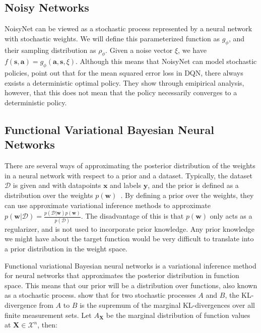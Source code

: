 \documentclass[]{uai2022} %
\newcommand{\D}{\mathcal{D}}
\newcommand{\X}{\mathbf{X}}
\begin{document}

\subsection{Noisy Networks}
NoisyNet can be viewed as a stochastic
process represented by a neural network with stochastic weights. We will define
this parameterized function as \(g_\phi\), and their sampling distribution as
\(\rho_\phi\). Given a noise vector \(\xi\), we have
\(f(\bm{s}, \bm{a}) = g_\phi(\bm{a}, \bm{s}, \xi)\). Although this means
that NoisyNet can model stochastic policies, \citet{fortunato_noisy_2019} point
out that for the mean squared error loss in DQN, there always exsists a deterministic
optimal policy. They show through emipirical analysis, however, that this does not
mean that the policy necessarily converges to a deterministic policy.

\subsection{Functional Variational Bayesian Neural Networks}
There are several ways of approximating the posterior distribution of the weights
in a neural network with respect to a prior and a dataset. Typically, the dataset
\(\D\) is given and with datapoints \(\bm{x}\) and labels \(\bm{y}\), and the 
prior is defined as a distribution over the weights
\(p(\bm{w})\)~\citep{rezende_stochastic_2014,blundell_weight_2015,ritter_scalable_2018,maddox_simple_2019}.
By defining a prior over the weights, they can use approximate variational inference
methods to approximate \(p(\bm{w} \vert \D) = \frac{p(\D \vert \bm{w})p(\bm{w})}{p(\D)}\).
The disadvantage of this is that \(p(\bm{w})\) only acts as a regularizer, and is not
used to incorporate prior knowledge. Any prior knowledge we might have about the target
function would be very difficult to translate into a prior distribution in the weight space.

Functional variational Bayesian neural networks \citep{sun_functional_2019} is 
a variational inference method for neural networks that approximates the 
posterior distribution in function space. This means that our prior will be a distribution
over functions, also known as a stochastic process.
\citet{sun_functional_2019} show that for two stochastic processes \(A\) and \(B\), the
KL-divergence from \(A\) to \(B\) is the supremum of the marginal KL-divergences over
all finite measurement sets. Let \(A_\X\) be the marginal distribution of function values
at \(\X \in \mathcal{X}^n\), then:
\end{document}
